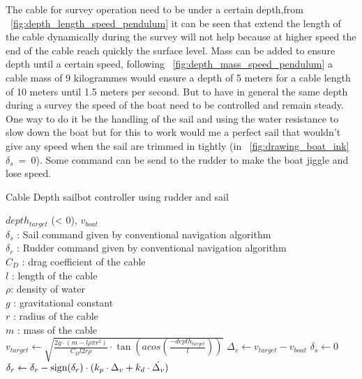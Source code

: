  The cable for survey operation need to be under a certain depth,from ~\ref{fig:depth_length_speed_pendulum} it can be seen that extend the length of the cable dynamically during the survey will not help because at higher speed the end of the cable reach quickly the surface level. Mass can be added to ensure depth until a certain speed, following ~\ref{fig:depth_mass_speed_pendulum} a cable mass of 9 kilogrammes would ensure a depth of 5 meters for a cable length of 10 meters until 1.5 meters per second.
   But to have in general the same depth during a survey the speed of the boat need to be controlled and remain steady. 
   One  way to do it be the handling of the sail and using the water resistance to slow down the boat but for this to work would me a perfect sail that wouldn't give any speed when the sail are trimmed in tightly (in ~\ref{fig:drawing_boat_ink} $\delta_s~=~0$).
   Some command can be send to the rudder to make the boat jiggle and lose speed.
 
\begin{algorithm}[H]
\caption{Cable Depth sailbot controller using rudder and sail }
\label{alg:breahAlg}
\begin{algorithmic}[1]
\REQUIRE $depth_{target}$ (< 0), $v_{boat}$\\
   $\delta_s$ : Sail command given by conventional navigation algorithm\\
   $\delta_r$ : Rudder command given by conventional navigation algorithm\\
   $C_D$ : drag coefficient of the cable \\
   $l$ : length of the cable\\
   $\rho$: density of water\\
   $g$ : gravitational constant\\
   $r$ : radius of the cable\\
   $m$ : mass of the cable\\
\STATE $v_{target} \leftarrow \sqrt{\frac{2 g \cdot (m - l \rho \pi r^2)}{C_D l 2 r \rho} \cdot \tan(acos(\frac{-depth_{target}}{l}))}$
\STATE $\Delta_{v} \leftarrow v_{target} - v_{boat}$
\STATE $\delta_s \leftarrow 0$
\STATE $\delta_r \leftarrow \delta_r - \textnormal{sign}(\delta_r) \cdot (k_p  \cdot \Delta_v + k_d \cdot \dot{\Delta_v})$
\ENDIF
\end{algorithmic}
\end{algorithm}

